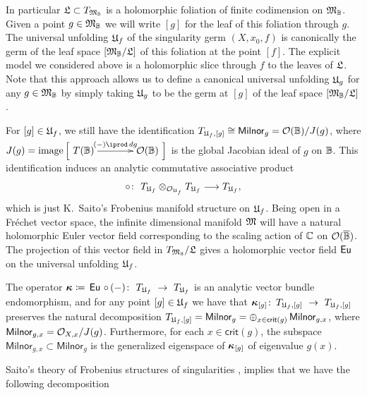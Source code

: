 \documentclass[twoside,leqno]{article}
\numberwithin{equation}{section}
\theoremstyle{plain}
\theoremstyle{definition}
\begin{document}
In particular $\mathfrak{L} \subset T_{\mathfrak{M}_{\mathbb{B}}}$ is a holomorphic foliation of finite codimension on $\mathfrak{M}_{\mathbb{B}}$. Given a point $g \in \mathfrak{M}_{\mathbb{B}}$ we will write  $[g]$ for the leaf of this foliation through $g$. The universal unfolding $\mathfrak{U}_{f}$ of the singularity germ $(X,x_{0},f)$ is canonically the germ of the leaf space $\left[\mathfrak{M}_{\mathbb{B}}/\mathfrak{L}\right]$ of this foliation at the point $[f]$. The explicit model we considered above is a holomorphic slice through $f$ to the leaves of $\mathfrak{L}$. Note that this approach allows us to define a canonical universal unfolding $\mathfrak{U}_{g}$ for any $g \in \mathfrak{M}_{\mathbb{B}}$ by simply taking $\mathfrak{U}_{g}$ to be the germ at $[g]$ of the leaf space $\left[\mathfrak{M}_{\mathbb{B}}/\mathfrak{L}\right]$.


For $[g] \in \mathfrak{U}_{f}$, we still have the identification $T_{\mathfrak{U}_{f},[g]} \cong \mathsf{Milnor}_{g} = \mathcal O(\mathbb{B})/J(g)$, where  $J(g) = \op{image}\Big[\xymatrix@1@C+1pc@M+0.2pc{T(\ball) \ar[r]^-{(-)\iprod \, dg} & \cO(\ball)}\Big]$ is the global Jacobian ideal of $g$ on $\mathbb{B}$. This identification induces an analytic 
commutative associative product  
\[
\fp \colon \ T_{\univ_{f}}\otimes_{\cO_{\univ_{f}}} T_{\univ_{f}} \longrightarrow T_{\univ_{f}},
\]
which is just K.~Saito's Frobenius manifold structure \cite{KyojiSaito-residue,KyojiSaito-primitive,MorihikoSaito-Brieskorn,Dubrovin_Geometry_of_2D,Sabbah-Isomonodromic} on $\mathfrak{U}_{f}$.  
Being open in a Fr\'{e}chet vector space, the infinite dimensional manifold $\mathfrak{M}$ will have a natural holomorphic Euler vector field corresponding to the scaling action of $\mathbb C$ on $\mathcal O(\overline{\mathbb{B}})$. The projection of this vector field in $T_{\mathfrak{M}_{\mathbb{B}}}/\mathfrak{L}$ gives a holomorphic vector field $\operatorname{\mathsf{Eu}}$ on the universal unfolding $\mathfrak{U}_{f}$.   
      
The operator $\boldsymbol{\kappa} \coloneqq \, \operatorname{\mathsf{Eu}}\, \circ \, (-) \colon \ T_{\mathfrak{U}_{f}} \ \to \ T_{\mathfrak{U}_{f}}$ 
is an analytic vector bundle endomorphism, and for any point $[g] \in \mathfrak{U}_{f}$ we have that 
$\bkappa_{[g]} \colon \, T_{\univ_{f},[g]} \ \to \ T_{\univ_{f},[g]}$ preserves the natural  decomposition $T_{\mathfrak{U}_{f},[g]} = \mathsf{Milnor}_{g} =  \oplus_{x \in \mathsf{crit}(g)} \, \mathsf{Milnor}_{g,x}$, where $\mathsf{Milnor}_{g,x} = \mathcal O_{X,x}/J(g)$. Furthermore, for each $x \in \mathsf{crit}(g)$, the subspace 
$\mathsf{Milnor}_{g,x} \subset \mathsf{Milnor}_{g}$ is the generalized eigenspace of $\boldsymbol{\kappa}_{[g]}$ of eigenvalue $g(x)$. 


\medskip

Saito's theory of Frobenius structures of singularities \cite{KyojiSaito-residue}, \cite[Chapter~VI]{Sabbah-Isomonodromic} implies that we have the following decomposition
\end{document}
